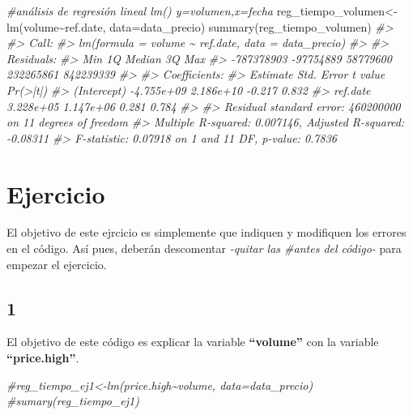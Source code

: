 \documentclass[
]{book}
\newenvironment{Shaded}{\begin{snugshade}}{\end{snugshade}}
\newcommand{\AttributeTok}[1]{\textcolor[rgb]{0.77,0.63,0.00}{#1}}
\newcommand{\CommentTok}[1]{\textcolor[rgb]{0.56,0.35,0.01}{\textit{#1}}}
\newcommand{\FunctionTok}[1]{\textcolor[rgb]{0.00,0.00,0.00}{#1}}
\newcommand{\NormalTok}[1]{#1}
\newcommand{\OtherTok}[1]{\textcolor[rgb]{0.56,0.35,0.01}{#1}}
\newcommand{\SpecialCharTok}[1]{\textcolor[rgb]{0.00,0.00,0.00}{#1}}
\begin{document}
\begin{Shaded}
\begin{Highlighting}[]
\CommentTok{\#análisis de regresión lineal lm() y=volumen,x=fecha}
\NormalTok{reg\_tiempo\_volumen}\OtherTok{\textless{}{-}}\FunctionTok{lm}\NormalTok{(volume}\SpecialCharTok{\textasciitilde{}}\NormalTok{ref.date, }\AttributeTok{data=}\NormalTok{data\_precio)}
\FunctionTok{summary}\NormalTok{(reg\_tiempo\_volumen)}
\CommentTok{\#\textgreater{} }
\CommentTok{\#\textgreater{} Call:}
\CommentTok{\#\textgreater{} lm(formula = volume \textasciitilde{} ref.date, data = data\_precio)}
\CommentTok{\#\textgreater{} }
\CommentTok{\#\textgreater{} Residuals:}
\CommentTok{\#\textgreater{}        Min         1Q     Median         3Q        Max }
\CommentTok{\#\textgreater{} {-}787378903  {-}97754889   58779600  232265861  842239339 }
\CommentTok{\#\textgreater{} }
\CommentTok{\#\textgreater{} Coefficients:}
\CommentTok{\#\textgreater{}               Estimate Std. Error t value Pr(\textgreater{}|t|)}
\CommentTok{\#\textgreater{} (Intercept) {-}4.755e+09  2.186e+10  {-}0.217    0.832}
\CommentTok{\#\textgreater{} ref.date     3.228e+05  1.147e+06   0.281    0.784}
\CommentTok{\#\textgreater{} }
\CommentTok{\#\textgreater{} Residual standard error: 460200000 on 11 degrees of freedom}
\CommentTok{\#\textgreater{} Multiple R{-}squared:  0.007146,   Adjusted R{-}squared:  {-}0.08311 }
\CommentTok{\#\textgreater{} F{-}statistic: 0.07918 on 1 and 11 DF,  p{-}value: 0.7836}
\end{Highlighting}
\end{Shaded}

\hypertarget{ejercicio}{%
\section{Ejercicio}\label{ejercicio}}

El objetivo de este ejrcicio es simplemente que indiquen y modifiquen los errores en el código. Así pues, deberán descomentar \emph{-quitar las \#antes del código-} para empezar el ejercicio.

\hypertarget{section}{%
\subsection{1}\label{section}}

El objetivo de este código es explicar la variable \textbf{``volume''} con la variable \textbf{``price.high''}.

\begin{Shaded}
\begin{Highlighting}[]
\CommentTok{\#reg\_tiempo\_ej1\textless{}{-}lm(price.high\textasciitilde{}volume, data=data\_precio)}
\CommentTok{\#sumary(reg\_tiempo\_ej1)}
\end{Highlighting}
\end{Shaded}
\end{document}
